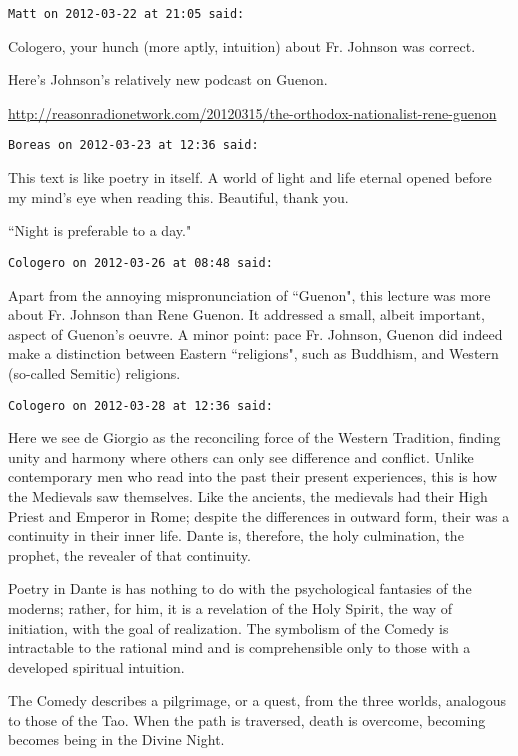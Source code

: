 \begin{footnotesize}\begin{sffamily}



\texttt{Matt on 2012-03-22 at 21:05 said: }

Cologero, your hunch (more aptly, intuition) about Fr. Johnson was correct.

Here's Johnson's relatively new podcast on Guenon.

\url{http://reasonradionetwork.com/20120315/the-orthodox-nationalist-rene-guenon}


\hfill

\texttt{Boreas on 2012-03-23 at 12:36 said: }

This text is like poetry in itself. A world of light and life eternal opened before my mind's eye when reading this. Beautiful, thank you.

``Night is preferable to a day."


\hfill

\texttt{Cologero on 2012-03-26 at 08:48 said: }

Apart from the annoying mispronunciation of ``Guenon", this lecture was more about Fr. Johnson than Rene Guenon. It addressed a small, albeit important, aspect of Guenon's oeuvre. A minor point: pace Fr. Johnson, Guenon did indeed make a distinction between Eastern ``religions", such as Buddhism, and Western (so-called Semitic) religions.


\hfill

\texttt{Cologero on 2012-03-28 at 12:36 said: }

Here we see de Giorgio as the reconciling force of the Western Tradition, finding unity and harmony where others can only see difference and conflict. Unlike contemporary men who read into the past their present experiences, this is how the Medievals saw themselves. Like the ancients, the medievals had their High Priest and Emperor in Rome; despite the differences in outward form, their was a continuity in their inner life. Dante is, therefore, the holy culmination, the prophet, the revealer of that continuity.

Poetry in Dante is has nothing to do with the psychological fantasies of the moderns; rather, for him, it is a revelation of the Holy Spirit, the way of initiation, with the goal of realization. The symbolism of the Comedy is intractable to the rational mind and is comprehensible only to those with a developed spiritual intuition.

The Comedy describes a pilgrimage, or a quest, from the three worlds, analogous to those of the Tao. When the path is traversed, death is overcome, becoming becomes being in the Divine Night.


\end{sffamily}
\end{footnotesize}
